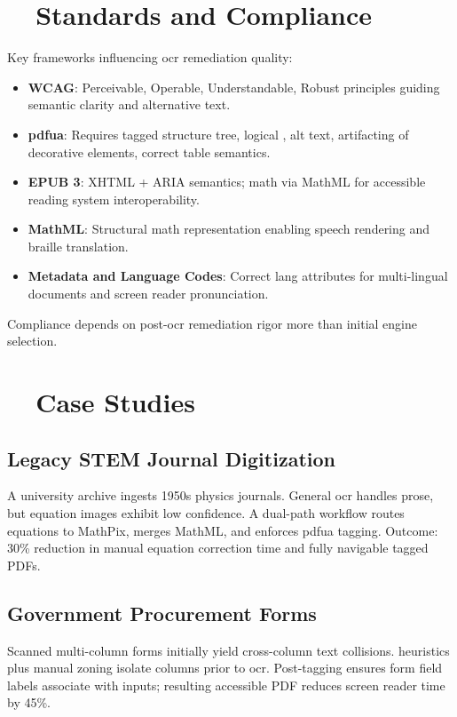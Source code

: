 \section{~~Standards and Compliance}
\label{sec:ocr-standards}
Key frameworks influencing \gls{ocr} remediation quality:
\begin{itemize}
	\item \textbf{WCAG}: Perceivable, Operable, Understandable, Robust principles guiding semantic clarity and alternative text.
	\item \textbf{\gls{pdfua}}: Requires tagged structure tree, logical , alt text, artifacting of decorative elements, correct table semantics.
	\item \textbf{EPUB 3}: XHTML + ARIA semantics; math via MathML for accessible reading system interoperability.
	\item \textbf{MathML}: Structural math representation enabling speech rendering and braille translation.
	\item \textbf{Metadata and Language Codes}: Correct lang attributes for multi-lingual documents and screen reader pronunciation.
\end{itemize}
Compliance depends on post-\gls{ocr} remediation rigor more than initial engine selection.

\section{~~Case Studies}
\label{sec:ocr-case-studies}
\subsection{Legacy STEM Journal Digitization}
A university archive ingests 1950s physics journals. General \gls{ocr} handles prose, but equation images exhibit low confidence. A dual-path workflow routes equations to MathPix, merges MathML, and enforces \gls{pdfua} tagging. Outcome: 30\% reduction in manual equation correction time and fully navigable tagged PDFs.
\subsection{Government Procurement Forms}
Scanned multi-column forms initially yield cross-column text collisions.  heuristics plus manual zoning isolate columns prior to \gls{ocr}. Post-tagging ensures form field labels associate with inputs; resulting accessible PDF reduces screen reader  time by 45\%.
